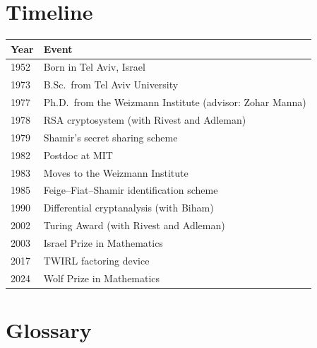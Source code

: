\section*{Timeline}

\begin{tabularx}{\linewidth}{|p{1.5cm}|>{\raggedright\arraybackslash}X|}
\hline
\textbf{Year} & \textbf{Event} \\ \hline
1952 & Born in Tel Aviv, Israel \\ \hline
1973 & B.Sc.\ from Tel Aviv University \\ \hline
1977 & Ph.D.\ from the Weizmann Institute (advisor: Zohar Manna) \\ \hline
1978 & RSA cryptosystem (with Rivest and Adleman) \\ \hline
1979 & Shamir's secret sharing scheme \\ \hline
1982 & Postdoc at MIT \\ \hline
1983 & Moves to the Weizmann Institute \\ \hline
1985 & Feige--Fiat--Shamir identification scheme \\ \hline
1990 & Differential cryptanalysis (with Biham) \\ \hline
2002 & Turing Award (with Rivest and Adleman) \\ \hline
2003 & Israel Prize in Mathematics \\ \hline
2017 & TWIRL factoring device \\ \hline
2024 & Wolf Prize in Mathematics \\ \hline
\end{tabularx}

\section*{Glossary}

